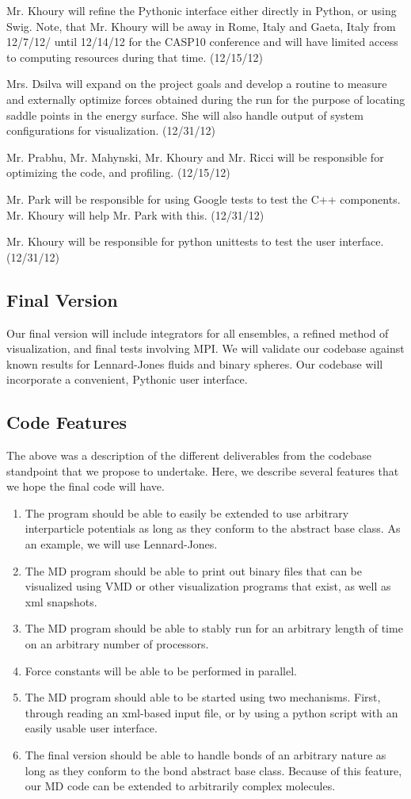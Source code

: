 \documentclass[10pt]{article}
\begin{document}
Mr. Khoury will refine the Pythonic interface either directly in Python, or using Swig. Note, that Mr. Khoury will be away in Rome, Italy and Gaeta, Italy from 12/7/12/ until 12/14/12 for the CASP10 conference and will have limited access to computing resources during that time.   (12/15/12)

Mrs. Dsilva will expand on the project goals and develop a routine to measure and externally optimize forces obtained during the run for the purpose of locating saddle points in the energy surface.  She will also handle output of system configurations for visualization.  (12/31/12)

Mr. Prabhu, Mr. Mahynski, Mr. Khoury and Mr. Ricci will  be responsible for optimizing the code, and profiling. (12/15/12)

Mr. Park will be responsible for using Google tests to test the C++ components. Mr. Khoury will help Mr. Park with this. (12/31/12)

Mr. Khoury will be responsible for python unittests to test the user interface. (12/31/12)

\subsection{Final Version}
Our final version will include integrators for all ensembles, a refined method of visualization, and final tests involving MPI.  We will validate our codebase against known results for Lennard-Jones fluids and binary spheres.  Our codebase will incorporate a convenient, Pythonic user interface.

\subsection{Code Features}
The above was a description of the different deliverables from the codebase standpoint that we propose to undertake. Here, we describe several features that we hope the final code will have.
\begin{enumerate}
    \item The program should be able to easily be extended to use arbitrary interparticle potentials as long as they conform to the abstract base class. As an example, we will use Lennard-Jones.
    \item The MD program should be able to print out binary files that can be visualized using VMD or other visualization programs that exist, as well as xml snapshots.
    \item The MD program should be able to stably run for an arbitrary length of time on an arbitrary number of processors.
    \item Force constants will be able to be performed in parallel.
    \item The MD program should able to be started using two mechanisms. First, through reading an xml-based input file, or by using a python script with an easily usable user interface.
    \item The final version should be able to handle bonds of an arbitrary nature as long as they conform to the bond abstract base class. Because of this feature, our MD code can be extended to arbitrarily complex molecules.
\end{enumerate}
\end{document}
